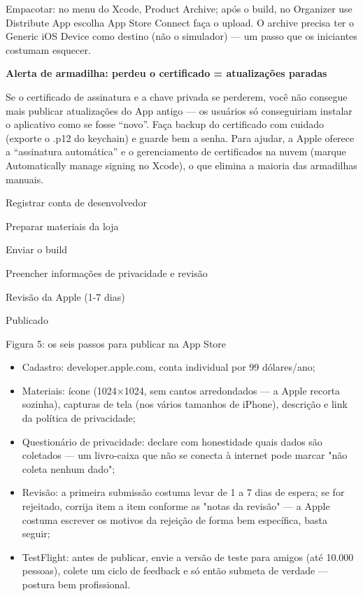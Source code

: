 Empacotar: no menu do Xcode, Product Archive; após o build, no Organizer use Distribute App escolha App Store Connect faça o upload. O archive precisa ter o Generic iOS Device como destino (não o simulador) — um passo que os iniciantes costumam esquecer.

\textbf{Alerta de armadilha: perdeu o certificado = atualizações paradas}\par

Se o certificado de assinatura e a chave privada se perderem, você não consegue mais publicar atualizações do App antigo — os usuários só conseguiriam instalar o aplicativo como se fosse “novo”. Faça backup do certificado com cuidado (exporte o .p12 do keychain) e guarde bem a senha. Para ajudar, a Apple oferece a “assinatura automática” e o gerenciamento de certificados na nuvem (marque Automatically manage signing no Xcode), o que elimina a maioria das armadilhas manuais.


Registrar conta de desenvolvedor

Preparar materiais da loja

Enviar o build

Preencher informações de privacidade e revisão

Revisão da Apple (1-7 dias)

Publicado

\begin{center}\small\color{gray}Figura 5: os seis passos para publicar na App Store\end{center}

\begin{itemize}
  \item Cadastro: developer.apple.com, conta individual por 99 dólares/ano;
  \item Materiais: ícone (1024×1024, sem cantos arredondados — a Apple recorta sozinha), capturas de tela (nos vários tamanhos de iPhone), descrição e link da política de privacidade;
  \item Questionário de privacidade: declare com honestidade quais dados são coletados — um livro-caixa que não se conecta à internet pode marcar "não coleta nenhum dado";
  \item Revisão: a primeira submissão costuma levar de 1 a 7 dias de espera; se for rejeitado, corrija item a item conforme as "notas da revisão" — a Apple costuma escrever os motivos da rejeição de forma bem específica, basta seguir;
  \item TestFlight: antes de publicar, envie a versão de teste para amigos (até 10.000 pessoas), colete um ciclo de feedback e só então submeta de verdade — postura bem profissional.
\end{itemize}

